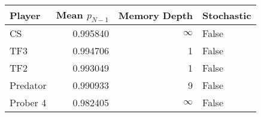 \begin{tabular}{lrrl}
\toprule
   Player &  Mean $p_{N-1}$ &  Memory Depth & Stochastic \\
\midrule
       CS &        0.995840 &            \(\infty\) &      False \\
      TF3 &        0.994706 &             1 &      False \\
      TF2 &        0.993049 &             1 &      False \\
 Predator &        0.990933 &             9 &      False \\
 Prober 4 &        0.982405 &            \(\infty\) &      False \\
\bottomrule
\end{tabular}
